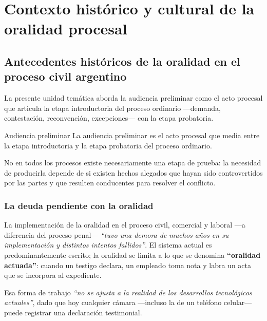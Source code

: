 \documentclass[12pt,oneside]{book}
\begin{document}
\chapter{Contexto histórico y cultural de la oralidad procesal}

\section{Antecedentes históricos de la oralidad en el proceso civil argentino}

La presente unidad temática aborda la audiencia preliminar como el acto procesal que articula la etapa introductoria del proceso ordinario —demanda, contestación, reconvención, excepciones— con la etapa probatoria.

\begin{definition}{Audiencia preliminar}
La audiencia preliminar es el acto procesal que media entre la etapa introductoria y la etapa probatoria del proceso ordinario.
\end{definition}

No en todos los procesos existe necesariamente una etapa de prueba: la necesidad de producirla depende de si existen hechos alegados que hayan sido controvertidos por las partes y que resulten conducentes para resolver el conflicto.

\subsection{La deuda pendiente con la oralidad}

La implementación de la oralidad en el proceso civil, comercial y laboral —a diferencia del proceso penal— \textit{“tuvo una demora de muchos años en su implementación y distintos intentos fallidos”}. El sistema actual es predominantemente escrito; la oralidad se limita a lo que se denomina \textbf{“oralidad actuada”}: cuando un testigo declara, un empleado toma nota y labra un acta que se incorpora al expediente.

\begin{note}
Esa forma de trabajo \textit{“no se ajusta a la realidad de los desarrollos tecnológicos actuales”}, dado que hoy cualquier cámara —incluso la de un teléfono celular— puede registrar una declaración testimonial.
\end{note}
\end{document}
